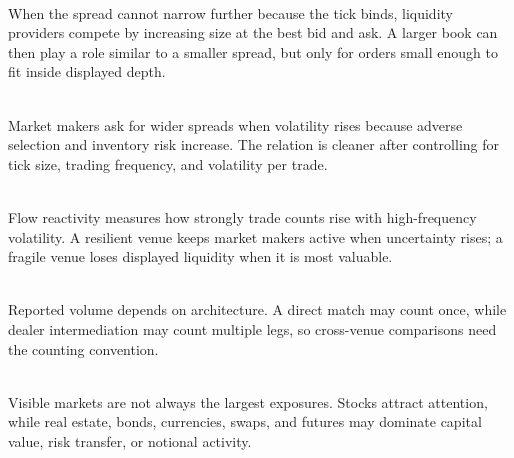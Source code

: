 \documentclass[a4paper,oneside,openany]{book}
\begin{document}
\begin{principle} \\
When the spread cannot narrow further because the tick binds, liquidity providers compete by increasing size at the best bid and ask. A larger book can then play a role similar to a smaller spread, but only for orders small enough to fit inside displayed depth.
\end{principle}

\begin{mechanism} \\
Market makers ask for wider spreads when volatility rises because adverse selection and inventory risk increase. The relation is cleaner after controlling for tick size, trading frequency, and volatility per trade.
\end{mechanism}

\begin{definition} \\
Flow reactivity measures how strongly trade counts rise with high-frequency volatility. A resilient venue keeps market makers active when uncertainty rises; a fragile venue loses displayed liquidity when it is most valuable.
\end{definition}

\begin{empiricalfinding} \\
Reported volume depends on architecture. A direct match may count once, while dealer intermediation may count multiple legs, so cross-venue comparisons need the counting convention.
\end{empiricalfinding}

\begin{caveat} \\
Visible markets are not always the largest exposures. Stocks attract attention, while real estate, bonds, currencies, swaps, and futures may dominate capital value, risk transfer, or notional activity.
\end{caveat}
\end{document}
